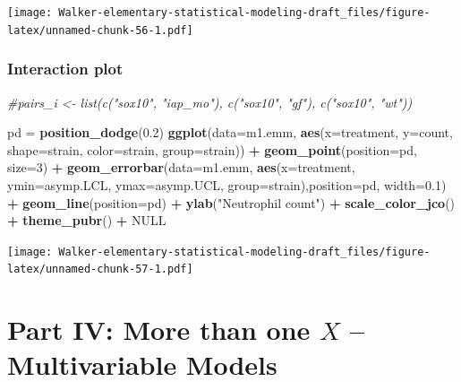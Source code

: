\documentclass[]{book}
\newenvironment{Shaded}{\begin{snugshade}}{\end{snugshade}}
\newcommand{\KeywordTok}[1]{\textcolor[rgb]{0.13,0.29,0.53}{\textbf{#1}}}
\newcommand{\DataTypeTok}[1]{\textcolor[rgb]{0.13,0.29,0.53}{#1}}
\newcommand{\DecValTok}[1]{\textcolor[rgb]{0.00,0.00,0.81}{#1}}
\newcommand{\FloatTok}[1]{\textcolor[rgb]{0.00,0.00,0.81}{#1}}
\newcommand{\StringTok}[1]{\textcolor[rgb]{0.31,0.60,0.02}{#1}}
\newcommand{\CommentTok}[1]{\textcolor[rgb]{0.56,0.35,0.01}{\textit{#1}}}
\newcommand{\OtherTok}[1]{\textcolor[rgb]{0.56,0.35,0.01}{#1}}
\newcommand{\OperatorTok}[1]{\textcolor[rgb]{0.81,0.36,0.00}{\textbf{#1}}}
\newcommand{\NormalTok}[1]{#1}
\begin{document}
\texttt{[image: Walker-elementary-statistical-modeling-draft\_files/figure-latex/unnamed-chunk-56-1.pdf]}

\subsection{Interaction plot}\label{interaction-plot}

\begin{Shaded}
\begin{Highlighting}[]
\CommentTok{#pairs_i <- list(c("sox10", "iap_mo"), c("sox10", "gf"), c("sox10", "wt"))}

\NormalTok{pd =}\StringTok{ }\KeywordTok{position_dodge}\NormalTok{(}\FloatTok{0.2}\NormalTok{)}
\KeywordTok{ggplot}\NormalTok{(}\DataTypeTok{data=}\NormalTok{m1.emm, }\KeywordTok{aes}\NormalTok{(}\DataTypeTok{x=}\NormalTok{treatment, }\DataTypeTok{y=}\NormalTok{count, }\DataTypeTok{shape=}\NormalTok{strain, }\DataTypeTok{color=}\NormalTok{strain, }\DataTypeTok{group=}\NormalTok{strain)) }\OperatorTok{+}
\StringTok{  }\KeywordTok{geom_point}\NormalTok{(}\DataTypeTok{position=}\NormalTok{pd, }\DataTypeTok{size=}\DecValTok{3}\NormalTok{) }\OperatorTok{+}
\StringTok{  }\KeywordTok{geom_errorbar}\NormalTok{(}\DataTypeTok{data=}\NormalTok{m1.emm, }\KeywordTok{aes}\NormalTok{(}\DataTypeTok{x=}\NormalTok{treatment, }\DataTypeTok{ymin=}\NormalTok{asymp.LCL, }\DataTypeTok{ymax=}\NormalTok{asymp.UCL, }\DataTypeTok{group=}\NormalTok{strain),}\DataTypeTok{position=}\NormalTok{pd, }\DataTypeTok{width=}\FloatTok{0.1}\NormalTok{) }\OperatorTok{+}
\StringTok{  }\KeywordTok{geom_line}\NormalTok{(}\DataTypeTok{position=}\NormalTok{pd) }\OperatorTok{+}
\StringTok{  }\KeywordTok{ylab}\NormalTok{(}\StringTok{"Neutrophil count"}\NormalTok{) }\OperatorTok{+}
\StringTok{  }\KeywordTok{scale_color_jco}\NormalTok{() }\OperatorTok{+}
\StringTok{  }\KeywordTok{theme_pubr}\NormalTok{() }\OperatorTok{+}
\StringTok{  }\OtherTok{NULL}
\end{Highlighting}
\end{Shaded}

\texttt{[image: Walker-elementary-statistical-modeling-draft\_files/figure-latex/unnamed-chunk-57-1.pdf]}

\chapter*{\texorpdfstring{Part IV: More than one \(X\) -- Multivariable
Models}{Part IV: More than one X -- Multivariable Models}}\label{part-iv-more-than-one-x-multivariable-models}
\end{document}
